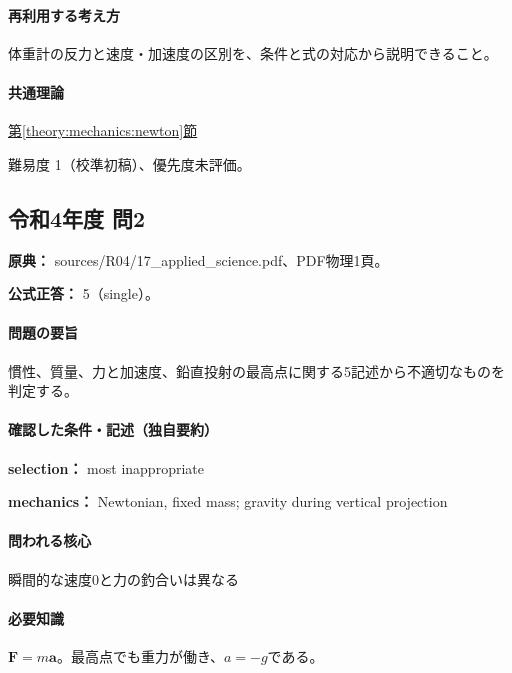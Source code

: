 \paragraph{再利用する考え方} 体重計の反力と速度・加速度の区別を、条件と式の対応から説明できること。

\paragraph{共通理論} \hyperref[theory:mechanics:newton]{第\ref*{theory:mechanics:newton}節}

\par 難易度 1（校準初稿）、優先度未評価。

\subsection{令和4年度 問2}
\label{q:r04-reg-applied-02}

\noindent\textbf{原典：} sources/R04/17\_applied\_science.pdf、PDF物理1頁。

\textbf{公式正答：} 5（single）。

\paragraph{問題の要旨} 慣性、質量、力と加速度、鉛直投射の最高点に関する5記述から不適切なものを判定する。

\paragraph{確認した条件・記述（独自要約）}\mbox{}\par

\noindent\textbf{selection：} most inappropriate\par

\noindent\textbf{mechanics：} Newtonian, fixed mass; gravity during vertical projection\par

\paragraph{問われる核心} 瞬間的な速度0と力の釣合いは異なる

\paragraph{必要知識} \(\mathbf F=m\mathbf a\)。最高点でも重力が働き、\(a=-g\)である。

